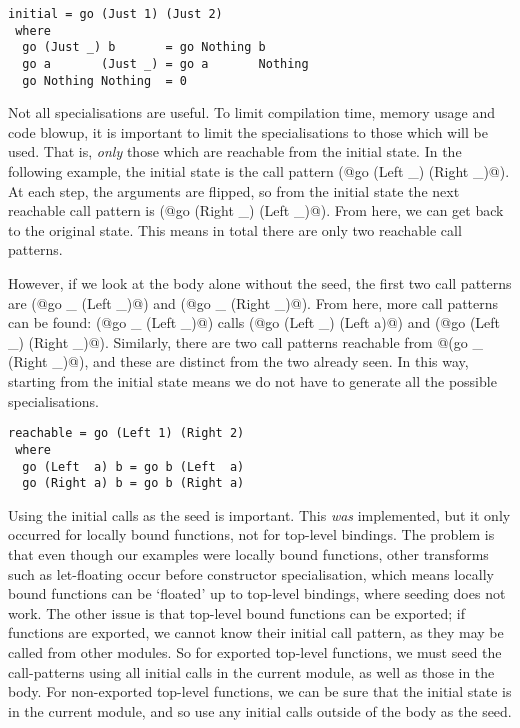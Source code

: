 \begin{lstlisting}
initial = go (Just 1) (Just 2)
 where
  go (Just _) b       = go Nothing b
  go a       (Just _) = go a       Nothing
  go Nothing Nothing  = 0
\end{lstlisting}

Not all specialisations are useful.
To limit compilation time, memory usage and code blowup, it is important to limit the specialisations to those which will be used.
That is, \emph{only} those which are reachable from the initial state.
In the following example, the initial state is the call pattern (@go (Left _) (Right _)@).
At each step, the arguments are flipped, so from the initial state the next reachable call pattern is (@go (Right _) (Left _)@).
From here, we can get back to the original state.
This means in total there are only two reachable call patterns.

However, if we look at the body alone without the seed, the first two call patterns are (@go _ (Left _)@) and (@go _ (Right _)@).
From here, more call patterns can be found: (@go _ (Left _)@) calls (@go (Left _) (Left a)@) and (@go (Left _) (Right _)@).
Similarly, there are two call patterns reachable from @(go _ (Right _)@), and these are distinct from the two already seen.
In this way, starting from the initial state means we do not have to generate all the possible specialisations.

\begin{lstlisting}
reachable = go (Left 1) (Right 2)
 where
  go (Left  a) b = go b (Left  a)
  go (Right a) b = go b (Right a)
\end{lstlisting}


Using the initial calls as the seed is important.
This \emph{was} implemented, but it only occurred for locally bound functions, not for top-level bindings.
The problem is that even though our examples were locally bound functions, other transforms such as let-floating occur before constructor specialisation, which means locally bound functions can be `floated' up to top-level bindings, where seeding does not work.
The other issue is that top-level bound functions can be exported; if functions are exported, we cannot know their initial call pattern, as they may be called from other modules.
So for exported top-level functions, we must seed the call-patterns using all initial calls in the current module, as well as those in the body.
For non-exported top-level functions, we can be sure that the initial state is in the current module, and so use any initial calls outside of the body as the seed.

